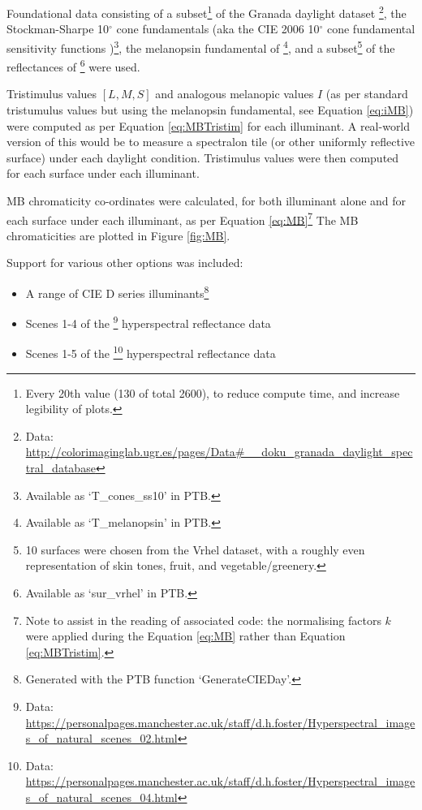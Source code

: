 Foundational data consisting of 
a subset\footnote{Every 20th value (130 of total 2600), to reduce compute time, and increase legibility of plots.} of the Granada daylight dataset 
\citep{hernandez-andres_color_2001}\footnote{Data: \url{http://colorimaginglab.ugr.es/pages/Data\#__doku_granada_daylight_spectral_database}},
the Stockman-Sharpe 10$^{\circ}$ cone fundamentals 
\citep{stockman_spectral_2000,stockman_spectral_1999}
(aka the CIE 2006 10$^{\circ}$ cone fundamental sensitivity functions \cite{cie_cie_2006})\footnote{Available as `T\_cones\_ss10' in \gls{PTB}.},
the melanopsin fundamental of \citet{lucas_measuring_2014}\footnote{Available as `T\_melanopsin' in \gls{PTB}.},
and a subset\footnote{10 surfaces were chosen from the Vrhel dataset, with a roughly even representation of skin tones, fruit, and vegetable/greenery.} 
of the reflectances of \citet{vrhel_measurement_1994}\footnote{Available as `sur\_vrhel' in \gls{PTB}.}
were used.

Tristimulus values $[L,M,S]$ and analogous melanopic values $I$ (as per standard tristumulus values but using the melanopsin fundamental, see Equation \ref{eq:iMB}) were computed as per Equation \ref{eq:MBTristim} for each illuminant. A real-world version of this would be to measure a spectralon tile (or other uniformly reflective surface) under each daylight condition. Tristimulus values were then computed for each surface under each illuminant.

\gls{MB} chromaticity co-ordinates were calculated, for both illuminant alone and for each surface under each illuminant, as per Equation \ref{eq:MB}\footnote{Note to assist in the reading of associated code: the normalising factors $k$ were applied during the Equation \ref{eq:MB} rather than Equation \ref{eq:MBTristim}.} The \gls{MB} chromaticities are plotted in Figure \ref{fig:MB}. 

\bigskip
\noindent
Support for various other options was included:
\begin{itemize}
    \item A range of CIE D series illuminants\footnote{Generated with the \gls{PTB} function `GenerateCIEDay'.}
    \item Scenes 1-4 of the
\citet{nascimento_statistics_2002}\footnote{Data: \url{https://personalpages.manchester.ac.uk/staff/d.h.foster/Hyperspectral_images_of_natural_scenes_02.html}} hyperspectral reflectance data
    \item Scenes 1-5 of the 
\citet{foster_frequency_2006}\footnote{Data: \url{https://personalpages.manchester.ac.uk/staff/d.h.foster/Hyperspectral_images_of_natural_scenes_04.html}}
hyperspectral reflectance data
\end{itemize}

